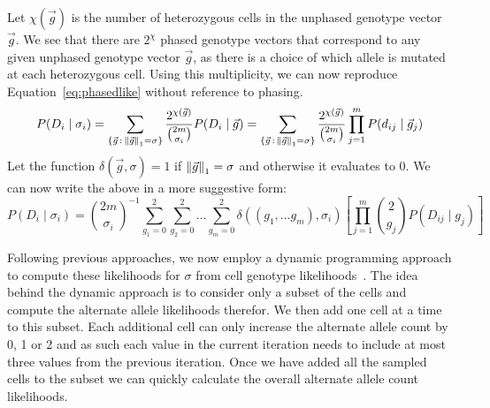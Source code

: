 \documentclass[../../main.tex]{subfiles}
\begin{document}
Let $\chi(\vec{g})$ is the number of heterozygous cells in the unphased genotype vector $\vec{g}$.
We see that there are $2^\chi$ phased genotype vectors that correspond to any given unphased genotype vector $\vec{g}$, as there is a choice of which allele is mutated at each heterozygous cell.
Using this multiplicity, we can now reproduce Equation~\eqref{eq:phasedlike} without reference to phasing.
\begin{equation*}
    P(D_i\mid\sigma_i) = \sum_{\{\vec{g}\, : \, \left\lVert\vec{g}\right\rVert_1=\sigma \}} \frac{2^{\chi(\vec{g})}}{\binom{2m}{\sigma_i}} P(D_i\mid\vec{g}) = \sum_{\{\vec{g}\, : \, \left\lVert\vec{g}\right\rVert_1=\sigma \}} \frac{2^{\chi(\vec{g})}}{\binom{2m}{\sigma_i}} \prod_{j=1}^{m}P(d_{ij}\mid \vec{g}_{j})
\end{equation*}
Let the function $\delta(\vec{g},\sigma) = 1$ if $\left\lVert\vec{g}\right\rVert_1=\sigma$ and otherwise it evaluates to 0.
We can now write the above in a more suggestive form:
\begin{equation}\label{eq:sitelikelihood}
P(D_i\mid\sigma_i) = \binom{2m}{\sigma_i}^{-1}\sum_{g_1=0}^2\sum_{g_2=0}^2\dots\sum_{g_m=0}^2 \delta((g_1,\dots g_m),\sigma_i)\left[\prod_{j=1}^{m}\binom{2}{g_j}P(D_{ij}\mid g_{j})\right]
\end{equation}

Following previous approaches, we now employ a dynamic programming approach to compute these likelihoods for $\sigma$ from cell genotype likelihoods~\cite{listatistical, monovar, sciphi, ledurbin}.
The idea behind the dynamic approach is to consider only a subset of the cells and compute the alternate allele likelihoods therefor.
We then add one cell at a time to this subset.
Each additional cell can only increase the alternate allele count by 0, 1 or 2 and as such each value in the current iteration needs to include at most three values from the previous iteration.
Once we have added all the sampled cells to the subset we can quickly calculate the overall alternate allele count likelihoods.
\end{document}
